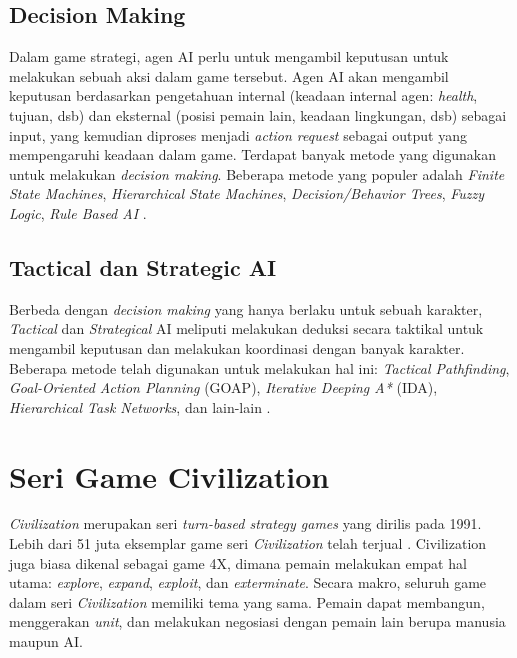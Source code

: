 \subsection{Decision Making}
Dalam game strategi, agen AI perlu untuk mengambil keputusan untuk melakukan sebuah aksi dalam game tersebut.
Agen AI akan mengambil keputusan berdasarkan pengetahuan internal (keadaan internal agen: \emph{health}, tujuan, dsb) dan eksternal 
(posisi pemain lain, keadaan lingkungan, dsb) sebagai input,
yang kemudian diproses menjadi \emph{action request} sebagai output yang mempengaruhi keadaan dalam game.
Terdapat banyak metode yang digunakan untuk melakukan \emph{decision making}. Beberapa metode yang populer adalah
\emph{Finite State Machines}, \emph{Hierarchical State Machines}, \emph{Decision/Behavior Trees}, \emph{Fuzzy Logic},
\emph{Rule Based AI} \citep{artificialInteligenceForGames}.

\subsection{Tactical dan Strategic AI}
Berbeda dengan \emph{decision making} yang hanya berlaku untuk sebuah karakter, 
\emph{Tactical} dan \emph{Strategical} AI meliputi melakukan deduksi secara taktikal untuk mengambil keputusan dan melakukan 
koordinasi dengan banyak karakter. Beberapa metode telah digunakan untuk melakukan hal ini: \emph{Tactical Pathfinding},
\emph{Goal-Oriented Action Planning} (GOAP), \emph{Iterative Deeping A*} (IDA), \emph{Hierarchical Task Networks}, dan lain-lain \citep{artificialInteligenceForGames}.

\section{Seri Game Civilization}
\emph{Civilization} merupakan seri \emph{turn-based strategy games} yang dirilis pada 1991. 
Lebih dari 51 juta eksemplar game seri \emph{Civilization} telah terjual \citep{civ6CopiesSold}.
Civilization juga biasa dikenal sebagai game 4X,
dimana pemain melakukan empat hal utama: \emph{explore}, \emph{expand}, \emph{exploit}, dan \emph{exterminate}. Secara makro, seluruh game
dalam seri \emph{Civilization} memiliki tema yang sama. Pemain dapat membangun, menggerakan \emph{unit}, dan melakukan negosiasi dengan pemain lain
berupa manusia maupun AI.

